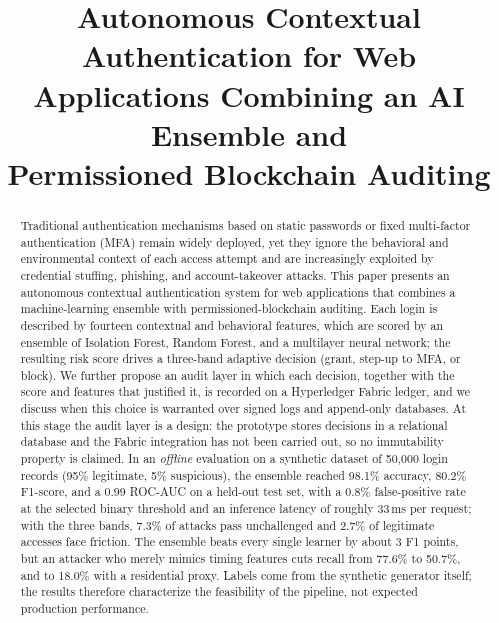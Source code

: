 \documentclass[conference]{IEEEtran}
\begin{document}
\title{Autonomous Contextual Authentication for Web\\ Applications Combining an AI Ensemble and\\ Permissioned Blockchain Auditing}

\author{
\and
{}
}

\maketitle

\begin{abstract}
Traditional authentication mechanisms based on static passwords or
fixed multi-factor authentication (MFA) remain widely deployed, yet
they ignore the behavioral and environmental context of each access
attempt and are increasingly exploited by credential stuffing,
phishing, and account-takeover attacks. This paper presents an
autonomous contextual authentication system for web applications that
combines a machine-learning ensemble with permissioned-blockchain
auditing. Each login is described by fourteen contextual and
behavioral features, which are scored by an ensemble of Isolation
Forest, Random Forest, and a multilayer neural network; the resulting
risk score drives a three-band adaptive decision (grant, step-up to
MFA, or block). We further propose an audit layer in which each
decision, together with the score and features that justified it, is
recorded on a Hyperledger Fabric ledger, and we discuss when this choice
is warranted over signed logs and append-only databases. At this stage
the audit layer is a design: the prototype stores decisions in a
relational database and the Fabric integration has not been carried out,
so no immutability property is claimed. In an \emph{offline} evaluation
on a synthetic dataset of 50{,}000 login records (95\% legitimate, 5\% suspicious), the ensemble
reached 98.1\% accuracy, 80.2\% F1-score, and a 0.99 ROC-AUC on a
held-out test set, with a 0.8\% false-positive rate at the selected
binary threshold and an inference latency of roughly 33\,ms per request;
with the three bands, 7.3\% of attacks pass unchallenged and 2.7\% of
legitimate accesses face friction. The ensemble beats every single
learner by about 3 F1 points, but an attacker who merely mimics timing
features cuts recall from 77.6\% to 50.7\%, and to 18.0\% with a
residential proxy.
Labels come from the synthetic generator itself; the results therefore
characterize the feasibility of the pipeline, not expected production
performance.
\end{abstract}
\end{document}
